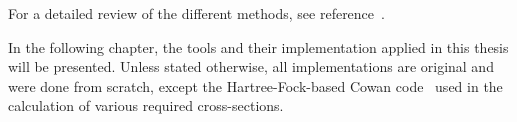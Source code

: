 For a detailed review of the different methods, see reference~\cite{Fennel2010}.

In the following chapter, the tools and their implementation applied in this
thesis will be presented. Unless stated otherwise, all implementations are original
and were done from scratch, except the Hartree-Fock-based Cowan code~\cite{CowanCode} used
in the calculation of various required cross-sections.


